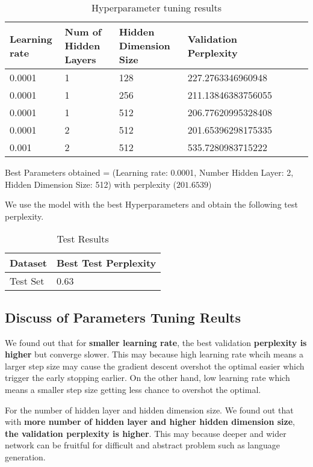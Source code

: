 \documentclass{article}
\begin{document}
\begin{table}[htb]
	\caption{Hyperparameter tuning results}
	\label{sample-table}
	\centering
	\begin{tabular}{lllllll}
		\toprule
		\cmidrule{1-4}
		Learning rate & Num of Hidden Layers & Hidden Dimension Size & Validation Perplexity\\
		\midrule
		0.0001 & 1 & 128 & 227.2763346960948 \\
		0.0001 & 1  & 256 & 211.13846383756055  \\
		0.0001 & 1  & 512 & 206.77620995328408  \\
		0.0001 & 2 & 512 & 201.65396298175335  \\
		0.001 & 2  & 512 & 535.7280983715222  \\
		\bottomrule
	\end{tabular}
\end{table}

Best Parameters obtained = (Learning rate: 0.0001, Number Hidden Layer: 2, Hidden Dimension Size: 512) with perplexity ($201.6539$)

We use the model with the best Hyperparameters and obtain the following test perplexity.

\pagebreak

\begin{table}[htb]
	\caption{Test Results}
	\label{sample-table}
	\centering
	\begin{tabular}{ll}
		\toprule
		\cmidrule{1-2}
		Dataset & Best Test Perplexity\\
		\midrule
		Test Set & 0.63   \\
		\bottomrule
	\end{tabular}
\end{table}

\subsection{Discuss of Parameters Tuning Reults}

We found out that for \textbf{smaller learning rate}, the best validation \textbf{perplexity is higher} but converge slower. This may because high learning rate whcih means a larger step size may cause the gradient descent overshot the optimal easier which trigger the early stopping earlier. On the other hand, low learning rate which means a smaller step size getting less chance to overshot the optimal.  

For the number of hidden layer and hidden dimension size. We found out that with \textbf{more number of hidden layer and higher hidden dimension size}, \textbf{the validation perplexity is higher}. This may because deeper and wider network can be fruitful for difficult and abstract problem such as language generation.
\end{document}
